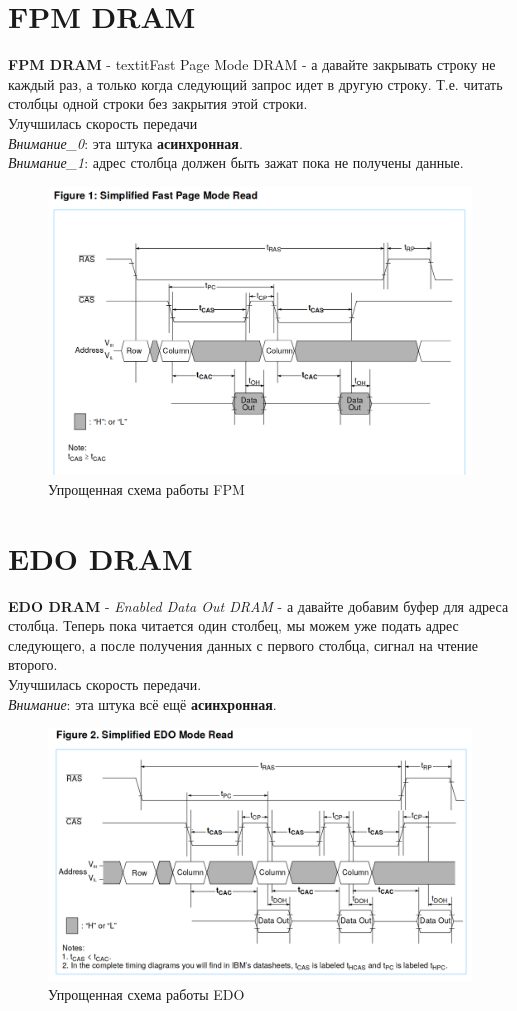 \documentclass[12pt, a4paper]{article}
\begin{document}
\section{FPM DRAM}
\textbf{FPM DRAM} - textit{Fast Page Mode DRAM} - а давайте закрывать строку не каждый раз, а только когда следующий запрос идет в другую строку. Т.е. читать столбцы одной строки без закрытия этой строки.\\
Улучшилась скорость передачи\\
\textit{Внимание\_0}: эта штука \textbf{асинхронная}.\\
\textit{Внимание\_1}: адрес столбца должен быть зажат пока не получены данные.
\begin{figure}[h]
    \centering
    \includegraphics[width=0.7\linewidth]{images/FPM.png}
    \caption{Упрощенная схема работы FPM}
    \label{fig:FPM}
\end{figure}
\section{EDO DRAM}
\textbf{EDO DRAM} - \textit{Enabled Data Out DRAM} - а давайте добавим буфер для адреса столбца. Теперь пока читается один столбец, мы можем уже подать адрес следующего, а после получения данных с первого столбца, сигнал на чтение второго.\\
Улучшилась скорость передачи.\\
\textit{Внимание}: эта штука всё ещё \textbf{асинхронная}.
\begin{figure}[h]
    \centering
    \includegraphics[width=0.7\linewidth]{images/EDO.png}
    \caption{Упрощенная схема работы EDO}
    \label{fig:EDO}
\end{figure}
\end{document}
